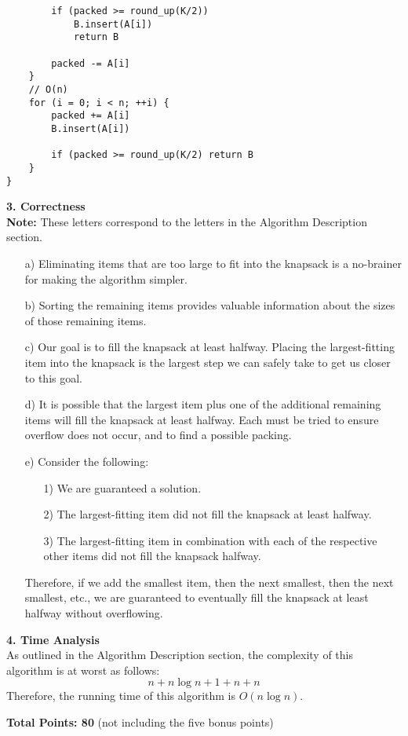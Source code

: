 \documentclass[11pt]{article}
\begin{document}
\begin{enumerate}
\begin{verbatim}
        if (packed >= round_up(K/2))
            B.insert(A[i])
            return B

        packed -= A[i]
    }
    // O(n)
    for (i = 0; i < n; ++i) {
        packed += A[i]
        B.insert(A[i])

        if (packed >= round_up(K/2) return B
    }
}

\end{verbatim}

\textbf{3. Correctness} \\
\textbf{Note:} These letters correspond to the letters in the Algorithm Description section.
\begin{itemize}
\item[a)] Eliminating items that are too large to fit into the knapsack is a no-brainer for making the algorithm simpler.
\item[b)] Sorting the remaining items provides valuable information about the sizes of those remaining items.
\item[c)] Our goal is to fill the knapsack at least halfway. Placing the largest-fitting item into the knapsack is the largest step we can safely take to get us closer to this goal.
\item[d)] It is possible that the largest item plus one of the additional remaining items will fill the knapsack at least halfway. Each must be tried to ensure overflow does not occur, and to find a possible packing.
\item[e)] Consider the following:
	\begin{itemize}
	\item[1)] We are guaranteed a solution.
    \item[2)] The largest-fitting item did not fill the knapsack at least halfway.
    \item[3)] The largest-fitting item in combination with each of the respective other items did not fill the knapsack halfway.
	\end{itemize}
    Therefore, if we add the smallest item, then the next smallest, then the next smallest, etc., we are guaranteed to eventually fill the knapsack at least halfway without overflowing.
\end{itemize}

\textbf{4. Time Analysis}\\
As outlined in the Algorithm Description section, the complexity of this algorithm is at worst as follows:
\[n + n\log n + 1 + n + n\]
Therefore, the running time of this algorithm is $O(n\log n)$.

\end{enumerate}


\vspace{0.3in}
{\bf Total Points: 80} (not including the five bonus points)
\end{document}
